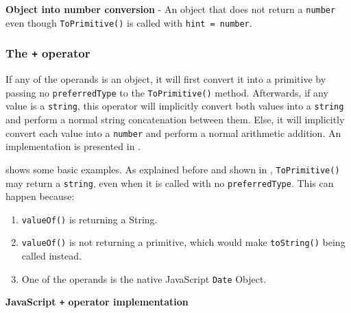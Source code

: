 \begin{code}
	\captionsetup{aboveskip=0pt, belowskip=10pt}
	\caption[Object into number conversion]{\textbf{Object into number conversion} - An object that does not return a \texttt{number} even though \texttt{ToPrimitive()} is called with \texttt{hint = number}.}
	\label{code:background-object-into-string-not-number-return-value}
\end{code}

\subsubsection{The \texttt{+} operator}
If any of the operands is an object, it will first convert it into a primitive by passing no \texttt{preferredType} to the \texttt{ToPrimitive()} method. Afterwards, if any value is a \texttt{string}, this operator will implicitly convert both values into a \texttt{string} and perform a normal string concatenation between them. Else, it will implicitly convert each value into a \texttt{number} and perform a normal arithmetic addition. An implementation is presented in .

 shows some basic examples. As explained before and shown in , \texttt{ToPrimitive()} may return a \texttt{string}, even when it is called with no \texttt{preferredType}. This can happen because:
\begin{enumerate}
	\item \texttt{valueOf()} is returning a String.
	\item \texttt{valueOf()} is not returning a primitive, which would make \texttt{toString()} being called instead.
	\item One of the operands is the native JavaScript \texttt{Date} Object.
\end{enumerate}

\begin{code}
	\captionsetup{aboveskip=0pt, belowskip=10pt}
	\caption[JavaScript + operator implementation]{\textbf{JavaScript \texttt{+} operator implementation}}
	\label{code:background-plus-operator-implementation}
\end{code}

